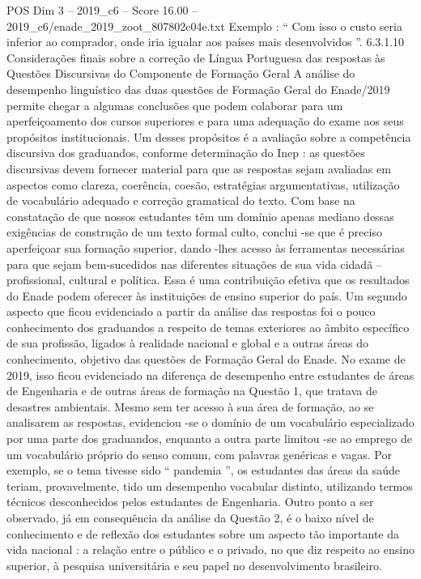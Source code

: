 \begin{textsample}{POS Dim 3 – 2019\_c6 – Score 16.00 – 2019\_c6/enade\_2019\_zoot\_807802c04e.txt}
Exemplo : “ Com isso o custo seria inferior ao comprador, onde iria igualar aos países mais desenvolvidos ”. 6.3.1.10 Considerações finais sobre a correção de Língua Portuguesa das respostas às Questões Discursivas do Componente de Formação Geral A análise do desempenho linguístico das duas questões de Formação Geral do Enade/2019 permite chegar a algumas conclusões que podem colaborar para um aperfeiçoamento dos cursos superiores e para uma adequação do exame aos seus propósitos institucionais.
Um desses propósitos é a avaliação sobre a competência discursiva dos graduandos, conforme determinação do Inep : as questões discursivas devem fornecer material para que as respostas sejam avaliadas em aspectos como clareza, coerência, coesão, estratégias argumentativas, utilização de vocabulário adequado e correção gramatical do texto.
Com base na constatação de que nossos estudantes têm um domínio apenas mediano dessas exigências de construção de um texto formal culto, conclui -se que é preciso aperfeiçoar sua formação superior, dando -lhes acesso às ferramentas necessárias para que sejam bem-sucedidos nas diferentes situações de sua vida cidadã – profissional, cultural e política.
Essa é uma contribuição efetiva que os resultados do Enade podem oferecer às instituições de ensino superior do país.
Um segundo aspecto que ficou evidenciado a partir da análise das respostas foi o pouco conhecimento dos graduandos a respeito de temas exteriores ao âmbito específico de sua profissão, ligados à realidade nacional e global e a outras áreas do conhecimento, objetivo das questões de Formação Geral do Enade.
No exame de 2019, isso ficou evidenciado na diferença de desempenho entre estudantes de áreas de Engenharia e de outras áreas de formação na Questão 1, que tratava de desastres ambientais.
Mesmo sem ter acesso à sua área de formação, ao se analisarem as respostas, evidenciou -se o domínio de um vocabulário especializado por uma parte dos graduandos, enquanto a outra parte limitou -se ao emprego de um vocabulário próprio do senso comum, com palavras genéricas e vagas.
Por exemplo, se o tema tivesse sido “ pandemia ”, os estudantes das áreas da saúde teriam, provavelmente, tido um desempenho vocabular distinto, utilizando termos técnicos desconhecidos pelos estudantes de Engenharia.
Outro ponto a ser observado, já em consequência da análise da Questão 2, é o baixo nível de conhecimento e de reflexão dos estudantes sobre um aspecto tão importante da vida nacional : a relação entre o público e o privado, no que diz respeito ao ensino superior, à pesquisa universitária e seu papel no desenvolvimento brasileiro.

\end{textsample}

